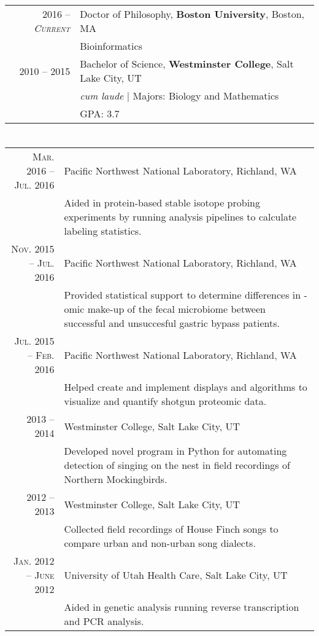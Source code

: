 \documentclass[a4paper,10pt]{article}
\begin{document}
\section{\color{linkcolour}{Education}}
\begin{tabular}{rl}
\textsc{2016 -- \emph{Current}} & Doctor of Philosophy, \textbf{Boston University}, Boston, MA \\
& Bioinformatics \\

 \textsc{2010 -- 2015} & Bachelor of Science, \textbf{Westminster College}, Salt Lake City, UT\\
& \small\emph{cum laude} | Majors: Biology and Mathematics\\
&\normalsize \textsc{GPA}: 3.7
\end{tabular}

\section{\color{linkcolour}{Research}}
\begin{tabular}{rp{10cm}}
\textsc{Mar. 2016 -- Jul. 2016} & Pacific Northwest National Laboratory, Richland, WA \\
& \footnotesize{Aided in protein-based stable isotope probing experiments by running analysis pipelines to  calculate labeling statistics.} \\
\textsc{Nov. 2015 -- Jul. 2016} & Pacific Northwest National Laboratory, Richland, WA \\
& \footnotesize{Provided statistical support to determine differences in -omic make-up of the fecal microbiome between successful and unsuccesful gastric bypass patients.} \\
\textsc{Jul. 2015 -- Feb. 2016} & Pacific Northwest National Laboratory, Richland, WA \\
& \footnotesize{Helped create and implement displays and algorithms to visualize and quantify shotgun proteomic data.} \\
 \textsc{2013 -- 2014} & Westminster College, Salt Lake City, UT\\
& \footnotesize{Developed novel program in Python for automating detection of singing on the nest in field recordings of Northern Mockingbirds.}\\
\textsc{2012 -- 2013} & Westminster College, Salt Lake City, UT\\
& \footnotesize{Collected field recordings of House Finch songs to compare urban and non-urban song dialects.}\\
\textsc{Jan. 2012 -- June 2012} & University of Utah Health Care, Salt Lake City, UT
\\& \footnotesize{Aided in genetic analysis running reverse transcription and PCR analysis.}
\end{tabular}
\end{document}

